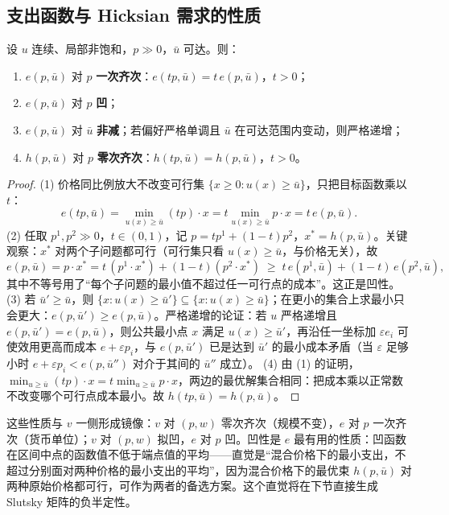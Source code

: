 \subsection{支出函数与 Hicksian 需求的性质}

\begin{proposition}[支出函数的基本性质]\label{prop:e-props}
设 $u$ 连续、局部非饱和，$p\gg0$，$\bar u$ 可达。则：
\begin{enumerate}
\item $e(p,\bar u)$ 对 $p$ \textbf{一次齐次}：$e(tp,\bar u)=t\,e(p,\bar u)$，$t>0$；
\item $e(p,\bar u)$ 对 $p$ \textbf{凹}；
\item $e(p,\bar u)$ 对 $\bar u$ \textbf{非减}；若偏好严格单调且 $\bar u$ 在可达范围内变动，则严格递增；
\item $h(p,\bar u)$ 对 $p$ \textbf{零次齐次}：$h(tp,\bar u)=h(p,\bar u)$，$t>0$。
\end{enumerate}
\end{proposition}

\begin{proof}
(1) 价格同比例放大不改变可行集 $\{x\ge0:u(x)\ge\bar u\}$，只把目标函数乘以 $t$：
\[
 e(tp,\bar u)=\min_{u(x)\ge\bar u}(tp)\cdot x=t\min_{u(x)\ge\bar u}p\cdot x=t\,e(p,\bar u).
\]
(2) 任取 $p^1,p^2\gg0$，$t\in(0,1)$，记 $p=tp^1+(1-t)p^2$，$x^*=h(p,\bar u)$。关键观察：$x^*$ 对两个子问题都可行（可行集只看 $u(x)\ge\bar u$，与价格无关），故
\[
 e(p,\bar u)=p\cdot x^*=t\,(p^1\cdot x^*)+(1-t)(p^2\cdot x^*)
 \;\ge\;t\,e(p^1,\bar u)+(1-t)\,e(p^2,\bar u),
\]
其中不等号用了“每个子问题的最小值不超过任一可行点的成本”。这正是凹性。
(3) 若 $\bar u'\ge\bar u$，则 $\{x:u(x)\ge\bar u'\}\subseteq\{x:u(x)\ge\bar u\}$；在更小的集合上求最小只会更大：$e(p,\bar u')\ge e(p,\bar u)$。严格递增的论证：若 $u$ 严格递增且 $e(p,\bar u')=e(p,\bar u)$，则公共最小点 $x$ 满足 $u(x)\ge\bar u'$，再沿任一坐标加 $\varepsilon e_i$ 可使效用更高而成本 $e+\varepsilon p_i$，与 $e(p,\bar u')$ 已是达到 $\bar u'$ 的最小成本矛盾（当 $\varepsilon$ 足够小时 $e+\varepsilon p_i<e(p,\bar u'')$ 对介于其间的 $\bar u''$ 成立）。
(4) 由 (1) 的证明，$\min_{u\ge\bar u}(tp)\cdot x=t\min_{u\ge\bar u}p\cdot x$，两边的最优解集合相同：把成本乘以正常数不改变哪个可行点成本最小。故 $h(tp,\bar u)=h(p,\bar u)$。
\end{proof}

\begin{remark}[对照 UMP 一侧]
这些性质与 $v$ 一侧形成镜像：$v$ 对 $(p,w)$ 零次齐次（规模不变），$e$ 对 $p$ 一次齐次（货币单位）；$v$ 对 $(p,w)$ 拟凹，$e$ 对 $p$ 凹。凹性是 $e$ 最有用的性质：凹函数在区间中点的函数值不低于端点值的平均——直觉是“混合价格下的最小支出，不超过分别面对两种价格的最小支出的平均”，因为混合价格下的最优束 $h(p,\bar u)$ 对两种原始价格都可行，可作为两者的备选方案。这个直觉将在下节直接生成 Slutsky 矩阵的负半定性。
\end{remark}

